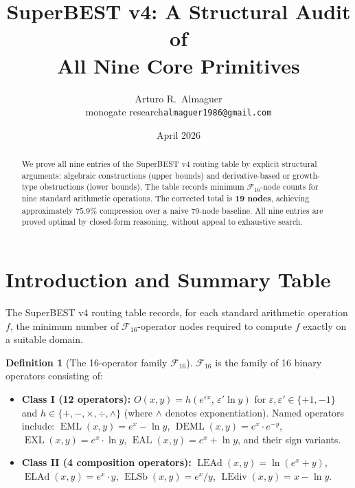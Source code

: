 \documentclass[12pt,a4paper]{article}
\title{SuperBEST v4: A Structural Audit of\\
       All Nine Core Primitives}
\author{Arturo R.\ Almaguer\\
  \small monogate research\quad\texttt{almaguer1986@gmail.com}}
\date{April 2026}
\theoremstyle{definition}
\newtheorem{definition}[theorem]{Definition}
\newcommand{\EML}{\operatorname{EML}}
\newcommand{\EXL}{\operatorname{EXL}}
\newcommand{\EAL}{\operatorname{EAL}}
\newcommand{\DEML}{\operatorname{DEML}}
\newcommand{\ELAd}{\operatorname{ELAd}}
\newcommand{\ELSb}{\operatorname{ELSb}}
\newcommand{\LEAd}{\operatorname{LEAd}}
\newcommand{\LEdiv}{\operatorname{LEdiv}}
\newcommand{\F}{\mathcal{F}_{16}}
\begin{document}
\maketitle

\begin{abstract}
We prove all nine entries of the SuperBEST v4 routing table by explicit
structural arguments: algebraic constructions (upper bounds) and derivative-based
or growth-type obstructions (lower bounds).  The table records minimum
$\mathcal{F}_{16}$-node counts for nine standard arithmetic operations.
The corrected total is \textbf{19 nodes}, achieving approximately $75.9\%$
compression over a naive 79-node baseline.  All nine entries are proved optimal
by closed-form reasoning, without appeal to exhaustive search.
\end{abstract}

\tableofcontents

\section{Introduction and Summary Table}
\label{sec:intro}

The SuperBEST v4 routing table records, for each standard arithmetic operation
$f$, the minimum number of $\mathcal{F}_{16}$-operator nodes required to compute
$f$ exactly on a suitable domain.

\begin{definition}[The 16-operator family $\F$]
\label{def:F16}
$\F$ is the family of 16 binary operators consisting of:
\begin{itemize}
  \item \textbf{Class I (12 operators):} $O(x,y) = h(e^{\varepsilon x},\,\varepsilon'\ln y)$
    for $\varepsilon,\varepsilon'\in\{+1,-1\}$ and $h\in\{+,-,\times,\div,\wedge\}$
    (where $\wedge$ denotes exponentiation).
    Named operators include: $\EML(x,y) = e^x - \ln y$,
    $\DEML(x,y) = e^x \cdot e^{-y}$, $\EXL(x,y) = e^x \cdot \ln y$,
    $\EAL(x,y) = e^x + \ln y$, and their sign variants.
  \item \textbf{Class II (4 composition operators):}
    $\LEAd(x,y) = \ln(e^x + y)$,\quad
    $\ELAd(x,y) = e^x \cdot y$,\quad
    $\ELSb(x,y) = e^x / y$,\quad
    $\LEdiv(x,y) = x - \ln y$.
\end{itemize}
\end{definition}
\end{document}
